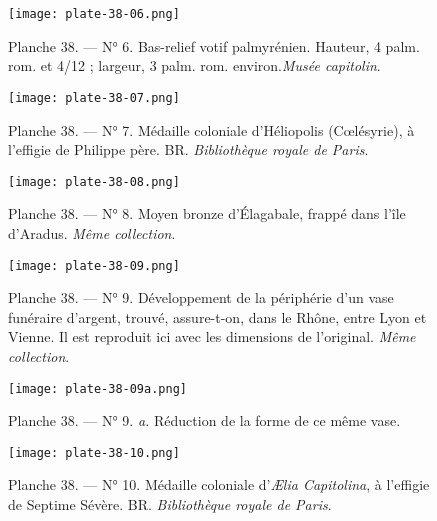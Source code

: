 \documentclass[a4paper, 11pt, oneside, polutonikogreek, french]{article}
\begin{document}
\begin{figure}[H]
\centering
\texttt{[image: plate-38-06.png]}
\caption[Planche 38. --- N° 6. Bas-relief votif palmyrénien. Hauteur, 4 palm. rom. et 4/12 ; largeur, 3 palm. rom. environ. \emph{Musée capitolin}.]{Planche 38. --- N° 6. Bas-relief votif palmyrénien. Hauteur, 4 palm. rom. et 4/12 ; largeur, 3 palm. rom. environ.\footnotemark \emph{Musée capitolin}.}
\end{figure}
\vspace*{\fill}
\clearpage
\vspace*{\fill}
\begin{figure}[H]
\centering
\texttt{[image: plate-38-07.png]}
\caption{Planche 38. --- N° 7. Médaille coloniale d'Héliopolis (Cœlésyrie), à l'effigie de Philippe père. BR. \emph{Bibliothèque royale de Paris}.}
\end{figure}
\vspace*{\fill}
\clearpage
\vspace*{\fill}
\begin{figure}[H]
\centering
\texttt{[image: plate-38-08.png]}
\caption{Planche 38. --- N° 8. Moyen bronze d'Élagabale, frappé dans l'île d'Aradus. \emph{Même collection}.}
\end{figure}
\vspace*{\fill}
\clearpage
\vspace*{\fill}
\begin{figure}[H]
\centering
\texttt{[image: plate-38-09.png]}
\caption{Planche 38. --- N° 9. Développement de la périphérie d'un vase funéraire d'argent, trouvé, assure-t-on, dans le Rhône, entre Lyon et Vienne. Il est reproduit ici avec les dimensions de l'original. \emph{Même collection}.}
\end{figure}
\vspace*{\fill}
\clearpage
\vspace*{\fill}
\begin{figure}[H]
\centering
\texttt{[image: plate-38-09a.png]}
\caption{Planche 38. --- N° 9. \emph{a.} Réduction de la forme de ce même vase.}
\end{figure}
\vspace*{\fill}
\clearpage
\vspace*{\fill}
\begin{figure}[H]
\centering
\texttt{[image: plate-38-10.png]}
\caption{Planche 38. --- N° 10. Médaille coloniale d'\emph{Ælia Capitolina}, à l'effigie de Septime Sévère. BR. \emph{Bibliothèque royale de Paris}.}
\end{figure}
\end{document}
